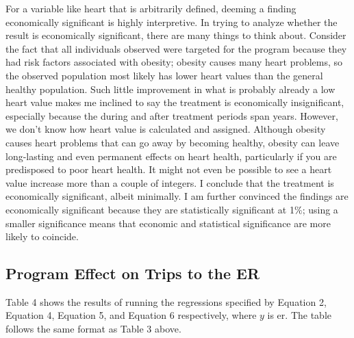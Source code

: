 \documentclass[a4paper]{article}
\begin{document}
For a variable like heart that is arbitrarily defined, deeming a finding economically significant is highly interpretive. In trying to analyze whether the result is economically significant, there are many things to think about. Consider the fact that all individuals observed were targeted for the program because they had risk factors associated with obesity; obesity causes many heart problems, so the observed population most likely has lower heart values than the general healthy population. Such little improvement in what is probably already a low heart value makes me inclined to say the treatment is economically insignificant, especially because the during and after treatment periods span years. However, we don't know how heart value is calculated and assigned. Although obesity causes heart problems that can go away by becoming healthy, obesity can leave long-lasting and even permanent effects on heart health, particularly if you are predisposed to poor heart health. It might not even be possible to see a heart value increase more than a couple of integers. I conclude that the treatment is economically significant, albeit minimally. I am further convinced the findings are economically significant because they are statistically significant at 1$\%$; using a smaller significance means that economic and statistical significance are more likely to coincide.


\subsection{Program Effect on Trips to the ER}

Table 4 shows the results of running the regressions specified by Equation 2, Equation 4, Equation 5, and Equation 6 respectively, where $y$ is er. The table follows the same format as Table 3 above. 

\begin{table}[H]
\centering

\end{table}
\end{document}
